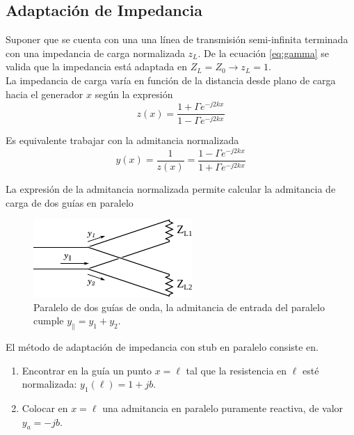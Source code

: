 \documentclass[11pt,a4paper]{article}
\begin{document}
\begin{multicols}{2}
\subsection{Adaptación de Impedancia}

Suponer que se cuenta con una una línea de transmisión semi-infinita terminada con una impedancia de carga normalizada $z_L$.
De la ecuación \ref{eq:gamma} se valida que la impedancia está adaptada en $Z_L = Z_0 \longrightarrow z_L = 1$.\\

La impedancia de carga varía en función de la distancia desde plano de carga hacia el generador $x$ según la expresión
\begin{equation*}
    z(x) = \frac{1 + \Gamma e^{-j2kx}}{1 - \Gamma e^{-j2kx}}
\end{equation*}

Es equivalente trabajar con la admitancia normalizada
\begin{equation*}
    y(x) = \frac{1}{z(x)} = \frac{1 - \Gamma e^{-j2kx}}{1 + \Gamma e^{-j2kx}}
\end{equation*}

La expresión de la admitancia normalizada permite calcular la admitancia de carga de dos guías en paralelo
\begin{figure}[H]
    \centering
    \includegraphics[width=0.7\linewidth]{Images/guiapll.pdf}
    \caption{Paralelo de dos guías de onda, la admitancia de entrada del paralelo cumple $y_\parallel = y_1+y_2$.}
    \label{fig:pll}
\end{figure}

El método de adaptación de impedancia con stub en paralelo consiste en. 
\begin{enumerate}
    \item Encontrar en la guía un punto $x = \ell$ tal que la resistencia en $\ell$ esté normalizada: $y_1(\ell)=1+jb$.
    \item Colocar en $x=\ell$ una admitancia en paralelo puramente reactiva, de valor $y_a = -jb$.
\end{enumerate}


\end{multicols}
\end{document}
